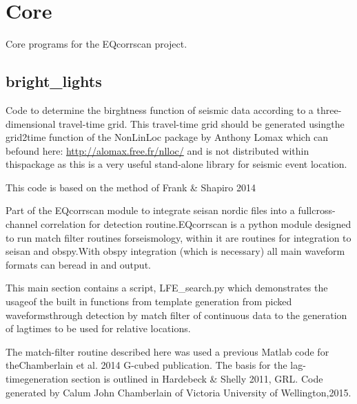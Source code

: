\documentclass[a4paper,10pt,english]{sphinxmanual}
\begin{document}
\section{Core}
\label{core:core}\label{core::doc}
Core programs for the EQcorrscan project.


\subsection{bright\_lights}
\label{core:bright-lights}\label{core:module-bright_lights}
Code to determine the birghtness function of seismic data according to a three-dimensional travel-time grid.  This travel-time grid should be generated usingthe grid2time function of the NonLinLoc package by Anthony Lomax which can befound here: \href{http://alomax.free.fr/nlloc/}{http://alomax.free.fr/nlloc/} and is not distributed within thispackage as this is a very useful stand-alone library for seismic event location.

This code is based on the method of Frank \& Shapiro 2014

Part of the EQcorrscan module to integrate seisan nordic files into a fullcross-channel correlation for detection routine.EQcorrscan is a python module designed to run match filter routines forseismology, within it are routines for integration to seisan and obspy.With obspy integration (which is necessary) all main waveform formats can beread in and output.

This main section contains a script, LFE\_search.py which demonstrates the usageof the built in functions from template generation from picked waveformsthrough detection by match filter of continuous data to the generation of lagtimes to be used for relative locations.

The match-filter routine described here was used a previous Matlab code for theChamberlain et al. 2014 G-cubed publication.  The basis for the lag-timegeneration section is outlined in Hardebeck \& Shelly 2011, GRL.
Code generated by Calum John Chamberlain of Victoria University of Wellington,2015.
\end{document}
